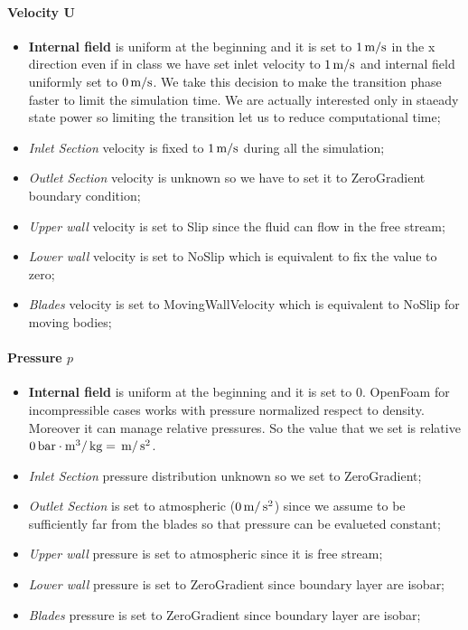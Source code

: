 \documentclass[a4paper,12pt]{article}
\begin{document}
\paragraph{Velocity U}
\begin{itemize}
\item \textbf{Internal field} is uniform at the beginning and it is set to $1\,\text{m}/\text{s}$ in the x direction even if in class we have set inlet velocity to $1\,\text{m}/\text{s}$ and internal field uniformly set to $0\,\text{m}/\text{s}$. We take this decision to make the transition phase faster to limit the simulation time. We are actually interested only in staeady state power so limiting the transition let us to reduce computational time;
\item \emph{Inlet Section} velocity is fixed to $1\,\text{m}/\text{s}$ during all the simulation; 
\item \emph{Outlet Section} velocity is unknown so we have to set it to ZeroGradient boundary condition;
\item \emph{Upper wall} velocity is set to Slip since the fluid can flow in the free stream;
\item \emph{Lower wall} velocity is set to NoSlip which is equivalent to fix the value to zero;
\item \emph{Blades} velocity is set to MovingWallVelocity which is equivalent to NoSlip for moving bodies;
\end{itemize}

\paragraph{Pressure $p$}
\begin{itemize}
\item \textbf{Internal field} is uniform at the beginning and it is set to $0$. 
OpenFoam for incompressible cases works with pressure normalized respect to density. 
Moreover it can manage relative pressures. 
So the value that we set is relative $0 \,\text{bar} \cdot \text{m}^3 / \,\text{kg} = \,\text{m} / \,\text{s}^2$.
\item \emph{Inlet Section} pressure distribution unknown so we set to ZeroGradient; 
\item \emph{Outlet Section} is set to atmospheric ($0 \,\text{m} / \,\text{s}^2$) since we assume to be sufficiently far from the blades so that pressure can be evalueted constant;
\item \emph{Upper wall} pressure is set to atmospheric since it is free stream;
\item \emph{Lower wall} pressure is set to ZeroGradient since boundary layer are isobar;
\item \emph{Blades} pressure is set to ZeroGradient since boundary layer are isobar;
\end{itemize}
\end{document}
